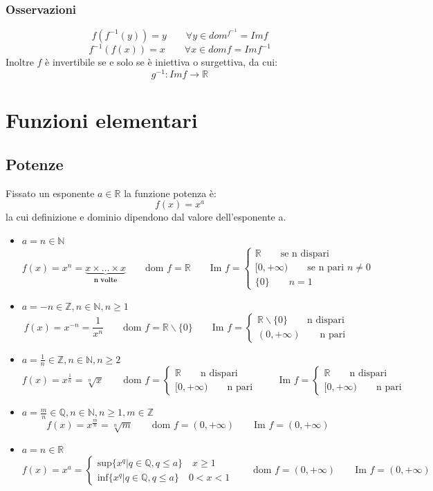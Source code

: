 \documentclass[11pt,a4paper,notitlepage]{report}
\let\numberset\mathbb
\newcommand{\N}{\numberset{N}}
\newcommand{\Z}{\numberset{Z}}
\newcommand{\Q}{\numberset{Q}}
\newcommand{\R}{\numberset{R}}
\newcommand{\dom}{\text{dom }}
\newcommand{\im}{\text{Im }}
\begin{document}
\subsubsection{Osservazioni}
\[f(f^{-1}(y)) = y \qquad \forall y \in dom^{f^{-1}}=Im f \]
\[f^{-1}(f(x)) = x \qquad \forall x \in dom f = Im f^{-1}\]
Inoltre $f$ è invertibile se e solo se è iniettiva o surgettiva, da cui: 
\[g^{-1}:Im f \rightarrow \R\]

\section{Funzioni elementari}
\subsection{Potenze}
Fissato un esponente $a \in \R$ la funzione potenza è:
\[f(x)=x^a\]
la cui definizione e dominio dipendono dal valore dell’esponente a.
\begin{itemize}
\item $a=n \in \N$
\[f(x)=x^n= \underbrace{x \times \dots \times x}_{\textbf{n volte}} \qquad \dom f=\R \qquad \im f= 
\begin{cases}
		\R \qquad \text{se n dispari} \\
		[0,+\infty )  \qquad \text{se n pari } n \neq 0 \\
		\{0\}  \qquad n = 1
\end{cases}\]

\item $a=-n\in \Z , n\in \N ,n \geq 1$
\[f(x)=x^{-n}=\frac{1}{x^n} \qquad \dom f = \R \backslash \{0\} \qquad \im f=
\begin{cases}
		\R \backslash \{0\} \qquad \text{n dispari} \\
		(0,+\infty )  \qquad \text{n pari }
\end{cases}
\]
\item $a=\frac{1}{n} \in \Z , n\in \N ,n \geq 2$
\[f(x)=x^{\frac{1}{n}}=\sqrt[n]{x} \qquad 
\dom f = 
\begin{cases}
		\R \qquad \text{n dispari} \\
		[0,+\infty )  \qquad \text{n pari }
\end{cases}
\qquad \im f=
\begin{cases}
		\R \qquad \text{n dispari} \\
		[0,+\infty) \qquad \text{n pari }
\end{cases}
\]

\item $a=\frac{m}{n} \in \Q , n\in \N ,n \geq 1 , m \in \Z$
\[f(x)=x^{\frac{m}{n}}=\sqrt[n]{m} \qquad 
\dom f = (0,+\infty)
\qquad \im f=(0,+\infty)\]

\item $a=n \in \R$
\[f(x)=x^a=
\begin{cases}
	\text{sup}\{x^q | q \in \Q , q \leq a\} \quad x \geq 1 \\
	\text{inf} \{x^q | q\in \Q , q \leq a\} \quad 0 < x < 1
\end{cases}
\qquad
\dom f = (0, + \infty)
\qquad
\im f = (0, + \infty)
\]
\end{itemize}
\end{document}

